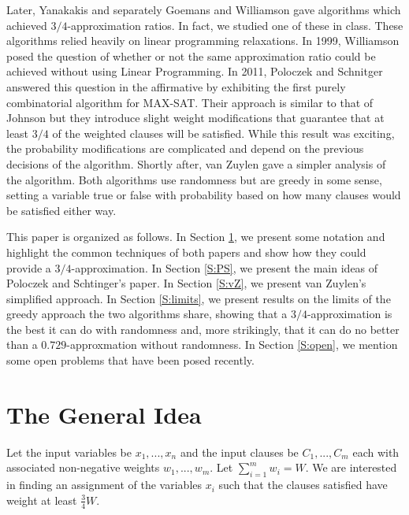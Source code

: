 \documentclass[11pt,letter]{article}
\begin{document}
Later, Yanakakis \cite{Yannakakis1994475} and separately Goemans and Williamson \cite{Goemans94new3/4-approximation}
gave algorithms which achieved $3/4$-approximation ratios. In fact, we studied one of these in class.
These algorithms relied heavily on linear programming relaxations. In 1999, Williamson posed the question
of whether or not the same approximation ratio could be achieved without using Linear Programming. In 2011,
Poloczek and Schnitger \cite{Poloczek:2011:RVJ:2133036.2133087} answered this question in the affirmative
by exhibiting the first purely combinatorial algorithm for MAX-SAT. Their approach is similar to that of Johnson
but they introduce slight weight modifications that guarantee that at least $3/4$ of the weighted clauses will be satisfied.
While this result was exciting, the probability modifications are complicated and depend on the previous decisions
of the algorithm. Shortly after, van Zuylen \cite{vanZuylen:2011:SAM:2238496.2238512} gave a simpler analysis of the algorithm.
Both algorithms use randomness but are greedy in some sense,
setting a variable true or false with probability based on
how many clauses would be satisfied either way.

This paper is organized as follows.
In Section \ref{S:idea}, we present some notation and highlight the common techniques of both papers
and show how they could provide a $3/4$-approximation.
In Section \ref{S:PS}, we present the main ideas of Poloczek and Schtinger's paper.
In Section \ref{S:vZ}, we present van Zuylen's simplified approach.
In Section \ref{S:limits}, we present results on the limits of
the greedy approach the two algorithms share,
showing that a $3/4$-approximation is the best it can do with randomness
and, more strikingly,
that it can do no better than a $0.729$-approxmation without randomness.
In Section \ref{S:open}, we mention some open problems that have been posed recently.


\section{The General Idea}\label{S:idea}

Let the input variables be $x_1,...,x_n$ and the input clauses be $C_1,...,C_m$
each with associated non-negative weights $w_1,...,w_m$. Let $\sum_{i=1}^{m} w_i = W$.
We are interested in finding an assignment of the variables $x_i$ such that the clauses satisfied have weight at least $\frac{3}{4}W$.
\end{document}
